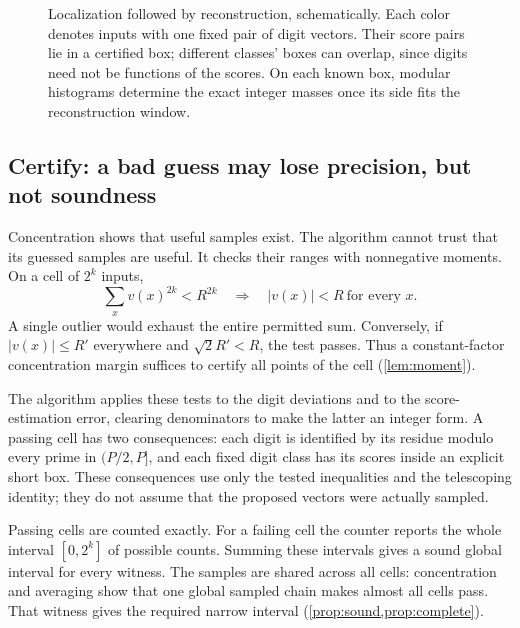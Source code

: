 \documentclass[11pt,letterpaper]{article}
\theoremstyle{definition}
\theoremstyle{remark}
\begin{document}
\begin{figure}[t]
\caption{Localization followed by reconstruction, schematically.
Each color denotes inputs with one fixed pair of digit vectors.
Their score pairs lie in a certified box; different classes' boxes
can overlap, since digits need not be functions of the scores.
On each known box, modular histograms determine the exact integer
masses once its side fits the reconstruction window.}
\label{fig:localization}
\end{figure}

\subsection{Certify: a bad guess may lose precision, but not soundness}

Concentration shows that useful samples exist. The algorithm cannot
trust that its guessed samples are useful. It checks their ranges
with nonnegative moments. On a cell of \(2^k\) inputs,
\[
 \sum_x v(x)^{2k}<R^{2k}
 \quad\Longrightarrow\quad |v(x)|<R\ \text{for every }x.
\]
A single outlier would exhaust the entire permitted sum. Conversely,
if \(|v(x)|\le R'\) everywhere and \(\sqrt2R'<R\), the test passes.
Thus a constant-factor concentration margin suffices to certify all
points of the cell (\cref{lem:moment}).

The algorithm applies these tests to the digit deviations and to
the score-estimation error, clearing denominators to make the latter
an integer form. A passing cell has two consequences: each digit is
identified by its residue modulo every prime in \((P/2,P]\), and
each fixed digit class has its scores inside an explicit short box.
These consequences use only the tested inequalities and the
telescoping identity; they do not assume that the proposed vectors
were actually sampled.

Passing cells are counted exactly. For a failing cell the counter
reports the whole interval \([0,2^k]\) of possible counts. Summing
these intervals gives a sound global interval for every witness.
The samples are shared across all cells: concentration and averaging
show that one global sampled chain makes almost all cells pass.
That witness gives the required narrow interval
(\cref{prop:sound,prop:complete}).
\end{document}
